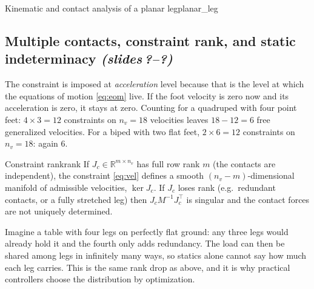 \documentclass[11pt,a4paper]{article}
\newcommand{\R}{\mathbb{R}}
\newcommand{\sr}{\emph{(slides\,?--?)}}
\newcommand{\Jc}{J_c}
\begin{document}
\begin{example}{Kinematic and contact analysis of a planar leg}{planar_leg}
\begin{center}
\end{center}
\end{example}

\subsection{Multiple contacts, constraint rank, and static indeterminacy \sr}

\begin{intuition}
The constraint is imposed at \emph{acceleration} level because that is the level at which
the equations of motion \eqref{eq:eom} live. If the foot velocity is zero now and its
acceleration is zero, it stays at zero. Counting for a quadruped with four point feet:
$4\times 3=12$ constraints on $n_v=18$ velocities leaves $18-12=6$ free generalized
velocities. For a biped with two flat feet, $2\times 6=12$ constraints on $n_v=18$: again $6$.
\end{intuition}

\begin{proposition}{Constraint rank}{rank}
If $\Jc\in\R^{m\times n_v}$ has full row rank $m$ (the contacts are independent), the
constraint \eqref{eq:vel} defines a smooth $(n_v-m)$-dimensional manifold of admissible
velocities, $\ker\Jc$. If $\Jc$ loses rank (e.g.\ redundant contacts, or a fully stretched
leg) then $\Jc M^{-1}\Jc^\top$ is singular and the contact forces are not uniquely determined.
\end{proposition}

\begin{intuition}
Imagine a table with four legs on perfectly flat ground: any three legs would already hold it
and the fourth only adds redundancy. The load can then be shared among legs in infinitely
many ways, so statics alone cannot say how much each leg carries. This is the same rank
drop as above, and it is why practical controllers choose the distribution by optimization.
\end{intuition}
\end{document}
